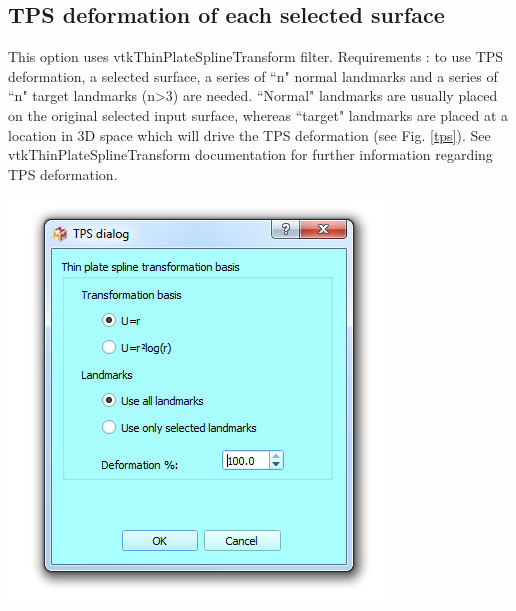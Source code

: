 \subsection{TPS deformation of each selected surface}
\noindent
\begin{minipage}{0.5\textwidth}
This option uses vtkThinPlateSplineTransform filter.
Requirements : to use TPS deformation, a selected surface,
a series of ``n" normal landmarks and a series of ``n"
target landmarks (n>3) are needed. ``Normal" landmarks
are usually placed on the original selected input surface,
whereas ``target" landmarks are placed at a location in 3D
space which will drive the TPS deformation (see Fig. \ref{tps}). See vtkThinPlateSplineTransform documentation for further information regarding TPS deformation.

\end{minipage}    
\begin{minipage}{0.5\textwidth}\centering
  \includegraphics[scale=0.5]{images/09/structure/tps_dialog.png}
 \end{minipage} 
\noindent

